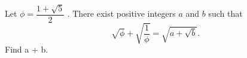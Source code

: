 Let $\phi = \dfrac{1+\sqrt5}{2}$ . There exist positive integers $a$ and $b$ such that \[\sqrt{\phi}+\sqrt{\dfrac{1}{\phi}}=\sqrt{a+\sqrt{b}}.\]Find a + b.
